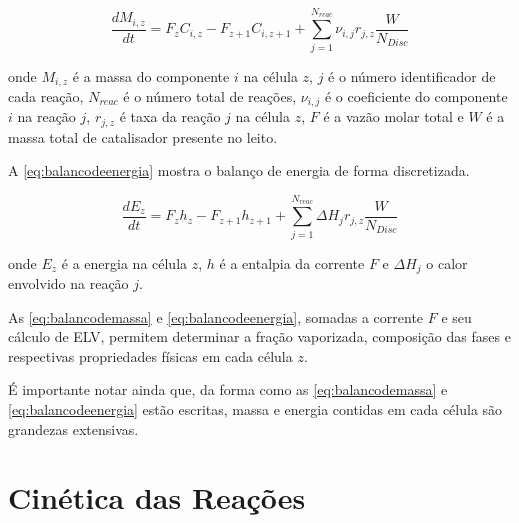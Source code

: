 \begin{equation}
\dfrac{dM_{i,z}}{dt} = F_zC_{i,z} - F_{z+1}C_{i,z+1} +
\displaystyle\sum_{j=1}^{N_{reac}} \nu_{i,j}r_{j,z} \dfrac{W}{N_{Disc}}
\label{eq:balancodemassa}
\end{equation}

onde $M_{i,z}$ é a massa do componente $i$ na célula $z$, $j$ é o número
identificador de cada reação, $N_{reac}$ é o número total de reações,
$\nu_{i,j}$ é o coeficiente do componente $i$ na reação $j$, $r_{j,z}$ é taxa
da reação $j$ na célula $z$, $F$ é a vazão molar total e $W$ é a massa total de
catalisador presente no leito.


A \autoref{eq:balancodeenergia} mostra o balanço de energia de forma
discretizada.

\begin{equation}
\dfrac{dE_{z}}{dt} = F_zh_{z} - F_{z+1}h_{z+1} +
\displaystyle\sum_{j=1}^{N_{reac}} \Delta H_{j}r_{j,z} \dfrac{W}{N_{Disc}}
\label{eq:balancodeenergia}
\end{equation}

onde $E_{z}$ é a energia na célula $z$,  $h$ é a entalpia da
corrente $F$ e $\Delta H_{j}$ o calor envolvido na reação $j$.


As \autoref{eq:balancodemassa} e \autoref{eq:balancodeenergia}, somadas a
corrente $F$ e seu cálculo de ELV, permitem determinar a fração vaporizada,
composição das fases e respectivas propriedades físicas em cada célula $z$.

É importante notar ainda que, da forma como as \autoref{eq:balancodemassa} e
\autoref{eq:balancodeenergia} estão escritas, massa e energia contidas em cada
célula são grandezas extensivas. 

\section{Cinética das Reações} \label{sec:cineticadasreacoes}

